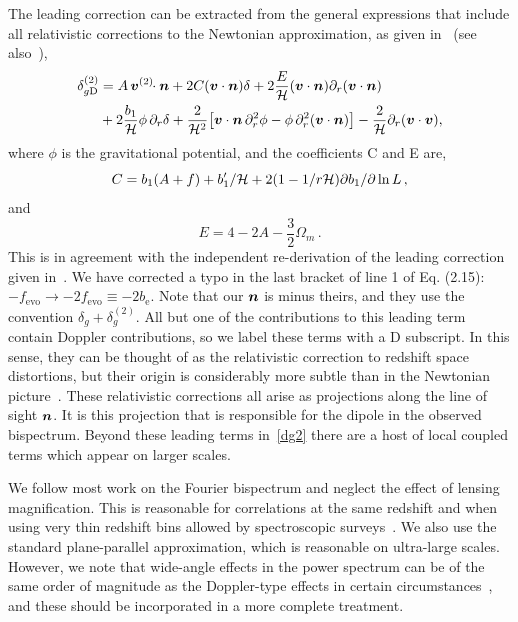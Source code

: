 The leading correction can be extracted from the general expressions that include all relativistic  corrections to the Newtonian approximation, as given in~\citet{Bertacca:2014hwa} (see also~\citet{Bertacca:2014dra,Yoo:2014sfa,DiDio:2014lka,Jolicoeur:2017nyt,DiDio:2018zmk}), 
\begin{align}
\delta^{(2)}_{g{\mathrm{D}}} &= A \, \bm{v}^{(2)}\!\!\cdot\bm {n}+2{C}(\bm{v}\cdot\bm {n})\delta +2 {\frac{E}{\mathcal{H}}}(\bm{v}\cdot\bm {n})\partial_r(\bm{v}\cdot\bm {n})\label{dg2}
\\ & \nonumber
+ 2 \frac{b_1}{\mathcal{H}}\phi\, \partial_r\delta
+ \frac{2}{\mathcal{H}^2} \big[\bm{v}\cdot\bm {n} \,\partial_r^2\phi-\phi\, \partial_r^2 (\bm{v}\cdot\bm {n}) \big] - \frac{2}{\mathcal{H}}\partial_r (\bm{v}\cdot\bm{v}), 
\end{align}
where $\phi$ is the gravitational potential, and the coefficients C and E are,
\begin{equation}
    C = b_1(A + f)+{b_1'/ \mathcal{H}}+ 2(1-{1/ r\mathcal{H}} ){\partial b_1/ \partial\ln L}\,,
\end{equation}
and
\begin{equation}
E = {4-2A-{\frac{3}{2}}\Omega_m}\,.
\end{equation}
This is in agreement with the independent re-derivation of the leading correction given in~\citet{DiDio:2018zmk}. We have corrected a typo in the last bracket of line 1 of Eq. (2.15): $-f_{\mathrm{evo}}\to -2f_{\mathrm{evo}}\equiv -2b_{\mathrm{e}}$. Note that our $\bm {n}$ is minus theirs, and they use the convention $\delta_g+\delta^{(2)}_g$.
All but one of the contributions to this leading term contain Doppler contributions, so we label these terms with a D subscript. In this sense, they can be thought of as the relativistic correction to redshift space distortions, but their origin is considerably more subtle than in the Newtonian picture~\citep{Bertacca:2014dra,DiDio:2018zmk}. These relativistic corrections all arise as projections along the line of sight $\bm {n}$. It is this projection that is responsible for the dipole in the observed bispectrum. Beyond these leading terms in~\eqref{dg2} there are a host of local coupled terms which appear on larger scales. 

We follow most work on the Fourier bispectrum and neglect the effect of lensing magnification. This is reasonable for correlations at the same redshift and when using very thin redshift bins allowed by spectroscopic surveys~\citep{DiDio:2018unb}. We also use the standard plane-parallel approximation, which is reasonable on ultra-large scales. However, we note that wide-angle effects in the power spectrum can be of the same order of magnitude as the Doppler-type effects in certain circumstances~\citep{Tansella:2017rpi}, and these should be incorporated in a more complete treatment.


